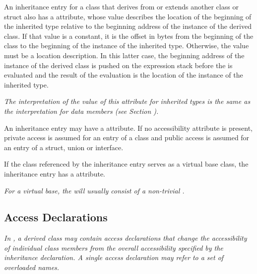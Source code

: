 An inheritance entry 
for a class that derives from or extends
\hypertarget{chap:DWATdatamemberlocationinheritedmemberlocation}{}
another class or struct also has a 
\DWATdatamemberlocationDEFN{} attribute, 
whose value describes the location of the beginning
of the inherited type relative to the beginning address of the
instance of the derived class. If that value is a constant, it is the offset
in bytes from the beginning of the class to the beginning of
the instance of the inherited type. Otherwise, the value must be a location
description. In this latter case, the beginning address of
the instance of the derived class is pushed on the expression stack before
the 
is evaluated and the result of the
evaluation is the location of the instance of the inherited type.

\textit{The interpretation of the value of this attribute for
inherited types is the same as the interpretation for data
members 
(see Section ).  }

An 
inheritance entry 
\hypertarget{chap:DWATaccessibilitycppinheritedmembers}{}
may 
have a
\DWATaccessibilityDEFN{}
attribute. 
If no accessibility attribute is present, private access 
is assumed for an entry of a class and public access is 
assumed for an entry of a struct, union or interface.

If\hypertarget{chap:DWATvirtualityvirtualityofbaseclass}{}
the class referenced by the 
inheritance entry serves
as a  virtual base class, the inheritance entry has a
\DWATvirtualityDEFN{} attribute.

\textit{For a  virtual base, the 
will usually consist of a non-trivial 
.}

\subsection{Access Declarations}
\label{chap:accessdeclarations}

\textit{In , a derived class may contain access declarations that
change the accessibility of individual class members from the
overall accessibility specified by the inheritance declaration.
A single access declaration may refer to a set of overloaded
names.}

